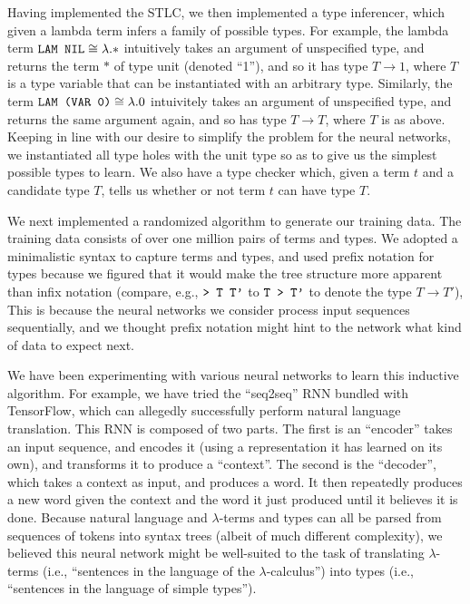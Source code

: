 \documentclass{amsart}
\begin{document}
Having implemented the STLC, we then implemented a type inferencer,
which given a lambda term infers a family of possible types. For
example, the lambda term $\verb!LAM NIL! \cong \lambda.*$ intuitively
takes an argument of unspecified type, and returns the term $*$ of
type unit (denoted ``1''), and so it has type $T \to 1$, where $T$ is
a type variable that can be instantiated with an arbitrary
type. Similarly, the term $\verb!LAM (VAR 0)! \cong \lambda.0$
intuivitely takes an argument of unspecified type, and returns the
same argument again, and so has type $T \to T$, where $T$ is as above.
Keeping in line with our desire to simplify the problem for the neural
networks, we instantiated all type holes with the unit type so as to
give us the simplest possible types to learn. We also have a type
checker which, given a term $t$ and a candidate type $T$, tells us
whether or not term $t$ can have type $T$.

We next implemented a randomized algorithm to generate our training
data. The training data consists of over one million pairs of terms and
types. We adopted a minimalistic syntax to capture terms and types, and
used prefix notation for types because we figured that it would make the
tree structure more apparent than infix notation (compare, e.g.,
$\verb!> T T'!$ to $\verb!T > T'!$ to denote the type $T \to T'$), This
is because the neural networks we consider process input sequences
sequentially, and we thought prefix notation might hint to the network
what kind of data to expect next.

We have been experimenting with various neural networks to learn this
inductive algorithm. For example, we have tried the ``seq2seq'' RNN
bundled with TensorFlow, which can allegedly successfully perform
natural language translation. This RNN is composed of two parts. The
first is an ``encoder'' takes an input sequence, and encodes it (using a
representation it has learned on its own), and transforms it to produce
a ``context''. The second is the ``decoder'', which takes a context as
input, and produces a word. It then repeatedly produces a new word given
the context and the word it just produced until it believes it is
done. Because natural language and $\lambda$-terms and types can all be
parsed from sequences of tokens into syntax trees (albeit of much
different complexity), we believed this neural network might be
well-suited to the task of translating $\lambda$-terms (i.e.,
``sentences in the language of the $\lambda$-calculus'') into types
(i.e., ``sentences in the language of simple types'').
\end{document}
